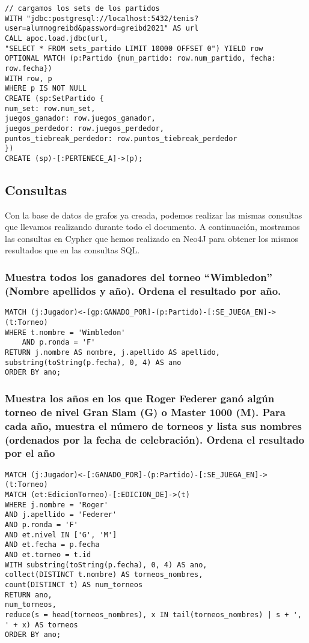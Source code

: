 \begin{verbatim}
// cargamos los sets de los partidos
WITH "jdbc:postgresql://localhost:5432/tenis?user=alumnogreibd&password=greibd2021" AS url
CALL apoc.load.jdbc(url,
"SELECT * FROM sets_partido LIMIT 10000 OFFSET 0") YIELD row
OPTIONAL MATCH (p:Partido {num_partido: row.num_partido, fecha: row.fecha})
WITH row, p
WHERE p IS NOT NULL
CREATE (sp:SetPartido {
num_set: row.num_set,
juegos_ganador: row.juegos_ganador,
juegos_perdedor: row.juegos_perdedor,
puntos_tiebreak_perdedor: row.puntos_tiebreak_perdedor
})
CREATE (sp)-[:PERTENECE_A]->(p);
\end{verbatim}


\subsection{Consultas}

Con la base de datos de grafos ya creada, podemos realizar las mismas consultas que llevamos realizando durante todo el documento. A continuación, mostramos las consultas en Cypher que hemos realizado en Neo4J para obtener los mismos resultados que en las consultas SQL. \\

\subsubsection{Muestra todos los ganadores del torneo ``Wimbledon'' (Nombre apellidos y año). Ordena el resultado por año.}

\begin{verbatim}
MATCH (j:Jugador)<-[gp:GANADO_POR]-(p:Partido)-[:SE_JUEGA_EN]->(t:Torneo)
WHERE t.nombre = 'Wimbledon'
    AND p.ronda = 'F'
RETURN j.nombre AS nombre, j.apellido AS apellido, substring(toString(p.fecha), 0, 4) AS ano
ORDER BY ano;
\end{verbatim}





\subsubsection{Muestra los años en los que Roger Federer ganó algún torneo de nivel Gran Slam (G) o Master 1000 (M). Para cada año, muestra el número de torneos y lista sus nombres (ordenados por la fecha de celebración). Ordena el resultado por el año}



\begin{verbatim}
MATCH (j:Jugador)<-[:GANADO_POR]-(p:Partido)-[:SE_JUEGA_EN]->(t:Torneo)
MATCH (et:EdicionTorneo)-[:EDICION_DE]->(t)
WHERE j.nombre = 'Roger'
AND j.apellido = 'Federer'
AND p.ronda = 'F'
AND et.nivel IN ['G', 'M']
AND et.fecha = p.fecha
AND et.torneo = t.id
WITH substring(toString(p.fecha), 0, 4) AS ano,
collect(DISTINCT t.nombre) AS torneos_nombres,
count(DISTINCT t) AS num_torneos
RETURN ano,
num_torneos,
reduce(s = head(torneos_nombres), x IN tail(torneos_nombres) | s + ', ' + x) AS torneos
ORDER BY ano;
\end{verbatim}





